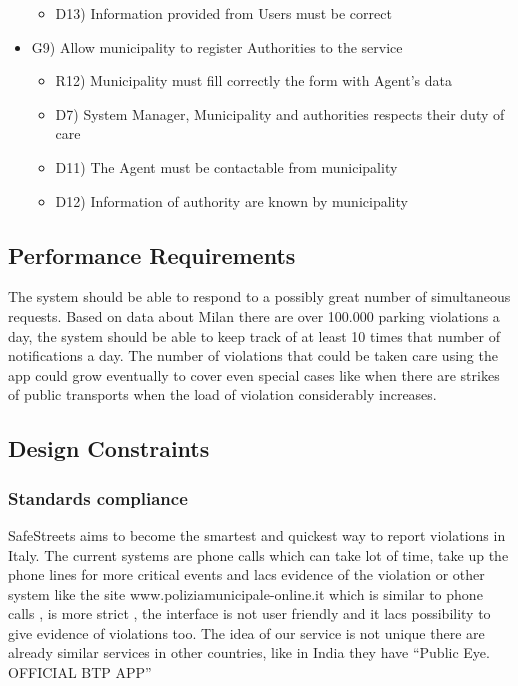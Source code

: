 \begin{itemize}
\begin{itemize}
\item D13) Information provided from Users must be correct
\end{itemize}
\item G9) Allow municipality to register Authorities to the service
\begin{itemize}
		\item R12) Municipality must fill correctly the form with Agent’s data
\item D7) System Manager, Municipality and authorities respects their duty of care
\item D11) The Agent must be contactable from municipality  
\item D12) Information of authority are known by municipality
\end{itemize}
\end{itemize}


\subsection{Performance Requirements}
The system should be able to respond to a possibly great number of simultaneous requests. Based on data about Milan there are over 100.000 parking violations a day, the system should be able to keep track of at least 10 times that number of notifications a day. The number of violations that could be taken care using the app could grow eventually to cover even special cases like when there are strikes of public transports when the load of violation considerably increases.
\subsection{Design Constraints}
\subsubsection{Standards compliance }
SafeStreets aims to become the smartest and quickest way to report violations in Italy. The current systems are phone calls which can take lot of time, take up the phone lines for more critical events and lacs evidence of the violation or other system like the site www.poliziamunicipale-online.it which is similar to phone calls , is more strict , the interface is not user friendly and it lacs possibility to give evidence of violations too. The idea of our service is not unique there are already similar services in other countries, like in India they have “Public Eye. OFFICIAL BTP APP” 
